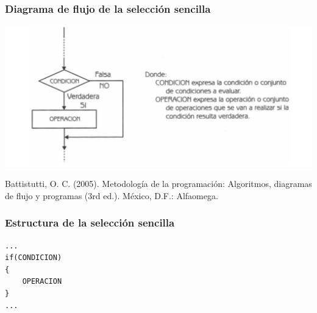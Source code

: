 \begin{frame}[c] \frametitle{Diagrama de flujo de la selección sencilla}
\begin{center}
\includegraphics[width=\textwidth]{figs/SeleccionSencillaDF.png}
\end{center}
\vspace*{10mm}
\tiny Battistutti, O. C. (2005). Metodología de la programación: Algoritmos, diagramas de flujo y programas (3rd ed.). México, D.F.: Alfaomega.
\end{frame}


\begin{frame}[fragile, c] \frametitle{Estructura de la selección sencilla}
\begin{lstlisting}
...
if(CONDICION)
{
    OPERACION
}
...
\end{lstlisting}
\vspace*{35mm}
\end{frame}






